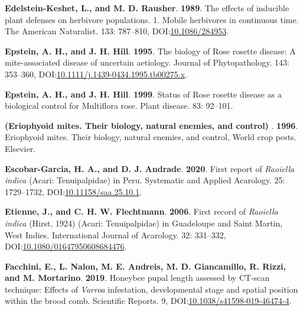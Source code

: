 \documentclass[12pt,final,CPage]{ufthesis}
\newlength{\cslhangindent}
\newenvironment{CSLReferences}[2] %
{%
	\setlength{\parindent}{0pt}
	\ifodd #1 \everypar{\setlength{\hangindent}{\cslhangindent}}\ignorespaces\fi
	\ifnum #2 > 0
	\setlength{\parskip}{#2\baselineskip}
	\fi
}%
{}
\begin{document}
{\begin{CSLReferences}{1}{0}
  \leavevmode{}%
  \textbf{Edelstein-Keshet, L., and M. D. Rausher}. \textbf{1989}. The effects of inducible plant defenses on herbivore populations. 1. Mobile herbivores in continuous time. The American Naturalist. 133: 787--810, DOI:\href{https://doi.org/10.1086/284953}{10.1086/284953}.

  \leavevmode{}%
  \textbf{Epstein, A. H., and J. H. Hill}. \textbf{1995}. The biology of {Rose rosette disease}: A mite-associated disease of uncertain aetiology. Journal of Phytopathology. 143: 353--360, DOI:\href{https://doi.org/10.1111/j.1439-0434.1995.tb00275.x}{10.1111/j.1439-0434.1995.tb00275.x}.

  \leavevmode{}%
  \textbf{Epstein, A. H., and J. H. Hill}. \textbf{1999}. Status of {Rose rosette disease} as a biological control for {Multiflora rose}. Plant disease. 83: 92--101.

  \leavevmode{}%
  \textbf{(Eriophyoid mites. Their biology, natural enemies, and control) }. \textbf{1996}. Eriophyoid mites. Their biology, natural enemies, and control, World crop pests. Elsevier.

  \leavevmode{}%
  \textbf{Escobar-Garcia, H. A., and D. J. Andrade}. \textbf{2020}. First report of {\emph{Raoiella indica}} ({Acari}: {Tenuipalpidae}) in {Peru}. Systematic and Applied Acarology. 25: 1729--1732, DOI:\href{https://doi.org/10.11158/saa.25.10.1}{10.11158/saa.25.10.1}.

  \leavevmode{}%
  \textbf{Etienne, J., and C. H. W. Flechtmann}. \textbf{2006}. First record of {\emph{Raoiella indica}} ({Hirst}, 1924) ({Acari}: {Tenuipalpidae}) in {Guadeloupe} and {Saint Martin}, {West Indies}. International Journal of Acarology. 32: 331--332, DOI:\href{https://doi.org/10.1080/01647950608684476}{10.1080/01647950608684476}.

  \leavevmode{}%
  \textbf{Facchini, E., L. Nalon, M. E. Andreis, M. D. Giancamillo, R. Rizzi, and M. Mortarino}. \textbf{2019}. Honeybee pupal length assessed by {CT}-scan technique: Effects of {\emph{Varroa}} infestation, developmental stage and spatial position within the brood comb. Scientific Reports. 9, DOI:\href{https://doi.org/10.1038/s41598-019-46474-4}{10.1038/s41598-019-46474-4}.


\end{CSLReferences}}
\end{document}
